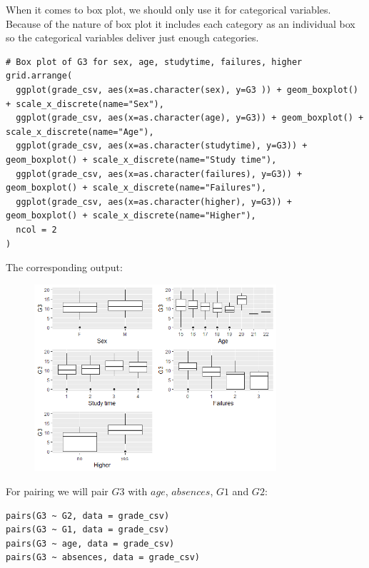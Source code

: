 \documentclass[a4paper]{article}
\numberwithin{equation}{section}
\begin{document}
When it comes to box plot, we should only use it for categorical variables. Because of the nature of box plot it includes each category as an individual box so the categorical variables deliver just enough categories.
\begin{mdframed}[leftline=false,rightline=false,backgroundcolor=magenta!10,nobreak=true]
  \begin{verbatim}
# Box plot of G3 for sex, age, studytime, failures, higher
grid.arrange(
  ggplot(grade_csv, aes(x=as.character(sex), y=G3 )) + geom_boxplot() + scale_x_discrete(name="Sex"),
  ggplot(grade_csv, aes(x=as.character(age), y=G3)) + geom_boxplot() + scale_x_discrete(name="Age"),
  ggplot(grade_csv, aes(x=as.character(studytime), y=G3)) + geom_boxplot() + scale_x_discrete(name="Study time"),
  ggplot(grade_csv, aes(x=as.character(failures), y=G3)) + geom_boxplot() + scale_x_discrete(name="Failures"),
  ggplot(grade_csv, aes(x=as.character(higher), y=G3)) + geom_boxplot() + scale_x_discrete(name="Higher"),
  ncol = 2
)
  \end{verbatim}
\end{mdframed}

The corresponding output:

\begin{figure}[H]
  \centering
  \includegraphics[width=0.8\textwidth]{boxplot.png}
\end{figure}

For pairing we will pair \(G3\) with \(age\), \(absences\), \(G1\) and \(G2\):
\begin{mdframed}[leftline=false,rightline=false,backgroundcolor=magenta!10,nobreak=true]
  \begin{verbatim}
pairs(G3 ~ G2, data = grade_csv)
pairs(G3 ~ G1, data = grade_csv)
pairs(G3 ~ age, data = grade_csv)
pairs(G3 ~ absences, data = grade_csv)
  \end{verbatim}
\end{mdframed}
\end{document}
